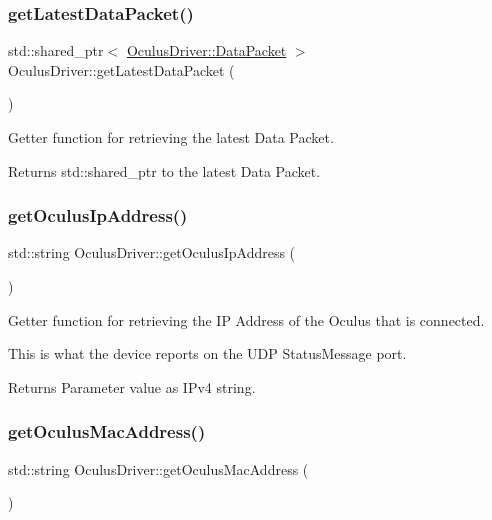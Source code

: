 \subsubsection{\texorpdfstring{get\+Latest\+Data\+Packet()}{getLatestDataPacket()}}
{\footnotesize\ttfamily std\+::shared\+\_\+ptr$<$ \hyperlink{structOculusDriver_1_1DataPacket}{Oculus\+Driver\+::\+Data\+Packet} $>$ Oculus\+Driver\+::get\+Latest\+Data\+Packet (\begin{DoxyParamCaption}{ }\end{DoxyParamCaption})}

Getter function for retrieving the latest Data Packet.

\begin{DoxyReturn}{Returns}
std\+::shared\+\_\+ptr to the latest Data Packet. 
\end{DoxyReturn}
\mbox{\label{classOculusDriver_a15bd2960efb1f5e93a994377cea09139}} 
\subsubsection{\texorpdfstring{get\+Oculus\+Ip\+Address()}{getOculusIpAddress()}}
{\footnotesize\ttfamily std\+::string Oculus\+Driver\+::get\+Oculus\+Ip\+Address (\begin{DoxyParamCaption}{ }\end{DoxyParamCaption})}

Getter function for retrieving the IP Address of the Oculus that is connected.

This is what the device reports on the U\+DP Status\+Message port.

\begin{DoxyReturn}{Returns}
Parameter value as I\+Pv4 string. 
\end{DoxyReturn}
\mbox{\label{classOculusDriver_a3006d773064e1707396a9ec2f7e4eae0}} 
\subsubsection{\texorpdfstring{get\+Oculus\+Mac\+Address()}{getOculusMacAddress()}}
{\footnotesize\ttfamily std\+::string Oculus\+Driver\+::get\+Oculus\+Mac\+Address (\begin{DoxyParamCaption}{ }\end{DoxyParamCaption})}

